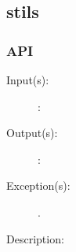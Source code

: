 %
%
%
%
%              

\subsection{stils}
\label{stils}

\subsubsection{API}
\begin{description}
\label{stils_}
\item[{\cfunc[]{stils\_}{}}: ]
	\begin{description}\item[]
	\item[Input(s): ]
		\begin{description}\item[]
		\item[: ]
		\end{description}
	\item[Output(s): ]
		\begin{description}\item[]
		\item[: ]
		\end{description}
	\item[Exception(s): ]
		\begin{description}\item[]
		\item[.]
		\end{description}
	\item[Description: ]
	\end{description}
\end{description}
